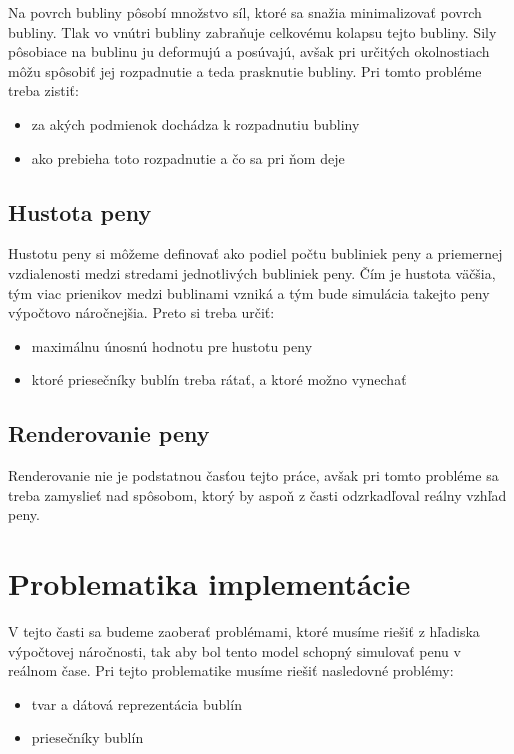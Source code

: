 Na povrch bubliny pôsobí množstvo síl, ktoré sa snažia minimalizovať povrch bubliny. Tlak vo vnútri bubliny zabraňuje celkovému kolapsu tejto bubliny. Sily pôsobiace na bublinu ju deformujú a posúvajú, avšak pri určitých okolnostiach môžu spôsobiť jej rozpadnutie a teda prasknutie bubliny. Pri tomto probléme treba zistiť:

\begin{itemize}
\item za akých podmienok dochádza k rozpadnutiu bubliny
\item ako prebieha toto rozpadnutie a čo sa pri ňom deje
\end{itemize}   

\subsection{Hustota peny}

Hustotu peny si môžeme definovať ako podiel počtu bubliniek peny a priemernej vzdialenosti medzi stredami jednotlivých bubliniek peny. Čím je hustota väčšia, tým viac prienikov medzi bublinami vzniká a tým bude simulácia takejto peny výpočtovo náročnejšia. Preto si treba určiť:

\begin{itemize}
\item maximálnu únosnú hodnotu pre hustotu peny
\item ktoré priesečníky bublín treba rátať, a ktoré možno vynechať
\end{itemize}

\subsection{Renderovanie peny}

Renderovanie nie je podstatnou časťou tejto práce, avšak pri tomto probléme sa treba zamyslieť nad spôsobom, ktorý by aspoň z časti odzrkadľoval reálny vzhľad peny.

\section{Problematika implementácie}

V tejto časti sa budeme zaoberať problémami, ktoré musíme riešiť z hľadiska výpočtovej náročnosti, tak aby bol tento model schopný simulovať penu v reálnom čase. 
\newpage \noindent Pri tejto problematike musíme riešiť nasledovné problémy:

\begin{itemize}
\item tvar a dátová reprezentácia bublín
\item priesečníky bublín
\end{itemize}

